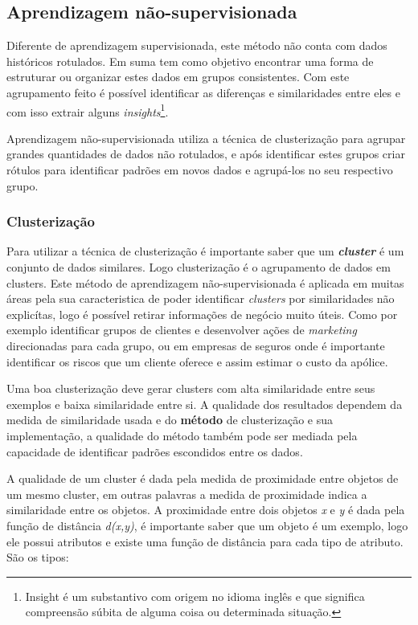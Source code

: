 \subsection{Aprendizagem não-supervisionada}
\label{subsec:unsupervised-learning}

Diferente de aprendizagem supervisionada, este método não conta com dados históricos rotulados. Em suma tem como objetivo encontrar
uma forma de estruturar ou organizar estes dados em grupos consistentes. Com este agrupamento feito é possível identificar 
as diferenças e similaridades entre eles e com isso extrair alguns 
\textit{insights}\footnote{ \cite{insight} Insight é um substantivo com origem no idioma inglês e que significa 
compreensão súbita de alguma coisa ou determinada situação.}.

Aprendizagem não-supervisionada utiliza a técnica de clusterização para agrupar grandes quantidades de dados não rotulados,
e após identificar estes grupos criar rótulos para identificar padrões em novos dados e agrupá-los no seu respectivo
grupo.

\subsubsection{Clusterização}
\label{subsec:clustering}
Para utilizar a técnica de clusterização é importante saber que um \textbf{\textit{cluster}} é um conjunto de dados similares.
Logo clusterização é o agrupamento de dados em clusters. Este método de aprendizagem não-supervisionada é aplicada em muitas áreas
pela sua caracteristica de poder identificar \textit{clusters} por similaridades não explicítas, logo é possível retirar informações
de negócio muito úteis. Como por exemplo identificar grupos de clientes e desenvolver ações de \textit{marketing} direcionadas
para cada grupo, ou em empresas de seguros onde é importante identificar os riscos que um cliente oferece e assim estimar o
custo da apólice.

Uma boa clusterização deve gerar clusters com alta similaridade entre seus exemplos e baixa similaridade entre si. A qualidade 
dos resultados dependem da medida de similaridade usada e do \textbf{método} de clusterização e sua implementação,
a qualidade do método também pode ser mediada pela capacidade de identificar padrões escondidos entre os dados.

A qualidade de um cluster é dada pela medida de proximidade entre objetos de um mesmo cluster, em outras palavras a medida de 
proximidade indica a similaridade entre os objetos. A proximidade entre dois objetos \textit{x} e \textit{y} é dada pela função
de distância \textit{d(x,y)}, é importante saber que um objeto é um exemplo, logo ele possui atributos e existe uma função de 
distância para cada tipo de atributo. São os tipos:

